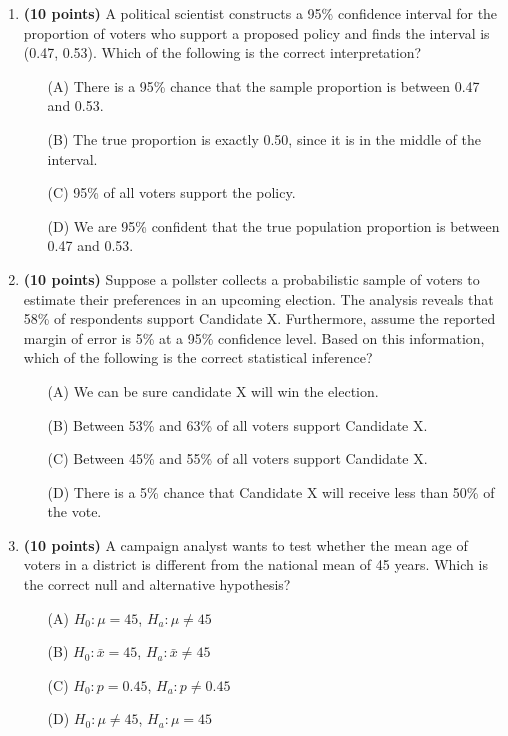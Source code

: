 \documentclass{article}
\newcommand{\blankbox}[2][3cm]{%
    \vspace{-0.5em}
    \begin{figure}[H]
        \makebox[\linewidth]{%
            \begin{tcolorbox}[
                colback=white,
                colframe=white,  %
                width=#2, %
                height=#1,
                boxrule=0.2mm
            ]
            \end{tcolorbox}
        }
    \end{figure}
    \vspace{-2em}
}
\begin{document}
\begin{enumerate}
    \item \textbf{(10 points)}   A political scientist constructs a 95\% confidence interval for the proportion of voters who support a proposed policy and finds the interval is (0.47, 0.53). Which of the following is the correct interpretation?
    \begin{enumerate}
        \item[(A)] There is a 95\% chance that the sample proportion is between 0.47 and 0.53.
        \item[(B)] The true proportion is exactly 0.50, since it is in the middle of the interval.
        \item[(C)] 95\% of all voters support the policy.
        \item[(D)]  We are 95\% confident that the true population proportion is between 0.47 and 0.53.
    \end{enumerate} \blankbox[2cm]{1.0\linewidth}


    \item \textbf{(10 points)} Suppose a pollster collects a probabilistic sample of voters to estimate their preferences in an upcoming election. The analysis reveals that 58\% of respondents support Candidate X. Furthermore, assume the reported margin of error is 5\% at a 95\% confidence level. Based on this information, which of the following is the correct statistical inference?

    \begin{enumerate}
        \item[(A)] We can be sure candidate X will win the election.
        \item[(B)] Between 53\% and 63\% of all voters support Candidate X.
        \item[(C)] Between 45\% and 55\% of all voters support Candidate X.
        \item[(D)] There is a 5\% chance that Candidate X will receive less than 50\% of the vote.
    \end{enumerate}
    \blankbox[2cm]{1.0\linewidth}


    \item \textbf{(10 points)}   A campaign analyst wants to test whether the mean age of voters in a district is different from the national mean of 45 years. Which is the correct null and alternative hypothesis?
    \begin{enumerate}
        \item[(A)] $H_0: \mu = 45$, $H_a: \mu \neq 45$
        \item[(B)] $H_0: \bar{x} = 45$, $H_a: \bar{x} \neq 45$
        \item[(C)] $H_0: p = 0.45$, $H_a: p \neq 0.45$
        \item[(D)] $H_0: \mu \neq 45$, $H_a: \mu = 45$
    \end{enumerate} \blankbox[2cm]{1.0\linewidth}


\end{enumerate}
\end{document}
